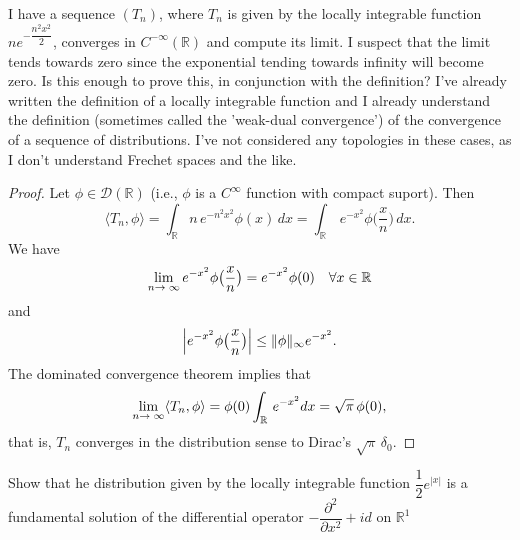 \begin{ex} I have a sequence $(T_n)$, where $T_n$ is given by the locally integrable function $ne^{-\dfrac{n^{2}x^{2}}{2}}$, converges in $C^{-\infty}(\mathbb{R})$ and compute its limit. 
I suspect that the limit tends towards zero since the exponential tending towards infinity will become zero. Is this enough to prove this, in conjunction with the definition? I've already written the definition of a locally integrable function and I already understand the definition (sometimes called the 'weak-dual convergence') of the convergence of a sequence of distributions. 
   I've not considered any topologies in these cases, as I don't understand Frechet spaces and the like. 
\end{ex}
\begin{proof}
Let $\phi\in\mathcal{D}(\mathbb{R})$ (i.e., $\phi$ is a $C^\infty$ function with compact suport). Then
$$
\langle T_n,\phi\rangle=\int_\mathbb{R}n\,e^{-n^2x^2}\phi(x)\,dx=\int_\mathbb{R}\,e^{-x^2}\phi\bigl(\frac xn\bigr)\,dx.
$$
We have 
$$
\lim_{n\rightarrow \;\infty}e^{-x^2}\phi\bigl(\frac xn\bigr)=e^{-x^2}\phi(0)\quad\forall x\in\mathbb{R}
$$
and
$$
\Bigl|e^{-x^2}\phi\bigl(\frac xn\bigr)\Bigr|\le \|\phi\|_\infty e^{-x^2}.
$$
The dominated convergence theorem implies that
$$
\lim_{n\rightarrow \;\infty}\langle T_n,\phi\rangle=\phi(0)\int_\mathbb{R}\,e^{-x^2}dx=\sqrt\pi\,\phi(0),
$$
that is, $T_n$ converges in the distribution sense to Dirac's $\sqrt\pi\,\delta_0$.
\end{proof}
\begin{ex}
 Show that he distribution given by the locally integrable function $\dfrac{1}{2} e^{|x|}$ is a fundamental solution of the differential operator 
$
-\dfrac{\partial^{2}}{\partial x^{2}} + id
$ on $\mathbb{R}^{1}$
\end{ex}

